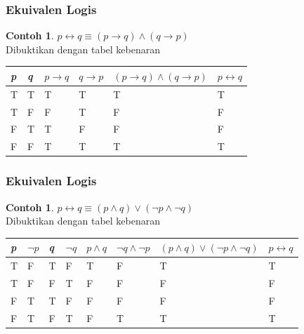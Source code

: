 \documentclass[handout]{beamer}
\theoremstyle{definition}
\theoremstyle{example}
\newtheorem{contoh}[theorem]{Contoh}
\begin{document}
\begin{frame}
	\frametitle{Ekuivalen Logis}	
	\begin{contoh}
		$p \leftrightarrow q \equiv (p \rightarrow q)\wedge (q \rightarrow p)$\\
		Dibuktikan dengan tabel kebenaran\\
		\begin{tabular}{ | l | l | l | l |l |l |}
			\hline
			\textit{p} & \textit{q} & $p \rightarrow q$  & $q \rightarrow p$ & $(p \rightarrow q)\wedge (q \rightarrow p)$ & $p \leftrightarrow q$\\ \hline
			T & T & T & T & T & T  \\ \hline
			T & F & F & T & F & F  \\ \hline
			F & T & T & F & F & F\\ \hline
			F & F & T & T & T & T \\     		 
			\hline
		\end{tabular}
	\end{contoh}	
\end{frame}

\begin{frame}
	\frametitle{Ekuivalen Logis}	
	\begin{contoh}
		$p \leftrightarrow q \equiv (p \wedge q)\vee(\neg p \wedge \neg q)$\\
		Dibuktikan dengan tabel kebenaran\\
		\begin{tabular}{ | l | l | l | l | l | l |l |l |}
			\hline
			\textit{p} & $\neg p$ &\textit{q}& $\neg q$ & $p \wedge q$  & $\neg q \wedge \neg p$ & $(p \wedge q)\vee(\neg p \wedge \neg q)$ & $p \leftrightarrow q$\\ \hline
			T & F & T & F & T & F & T & T  \\ \hline
			T & F & F & T & F & F & F & F  \\ \hline
			F & T & T & F & F & F & F & F\\ \hline
			F & T & F & T & F & T & T & T \\     		 
			\hline
		\end{tabular}
	\end{contoh}	
\end{frame}
\end{document}
